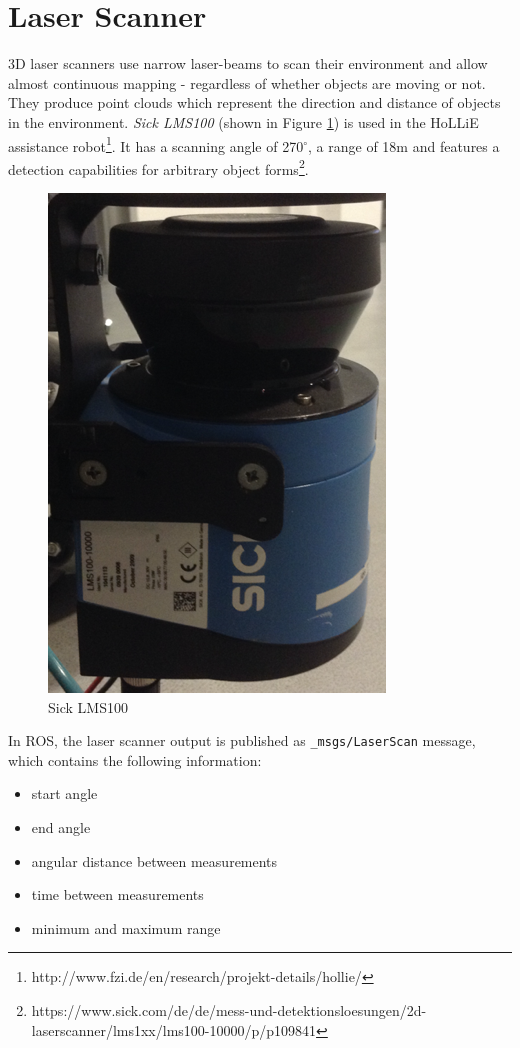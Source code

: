 \section{Laser Scanner}
3D laser scanners use narrow laser-beams to scan their environment and allow almost continuous mapping - regardless of whether objects are moving or not. They produce point clouds which represent the direction and distance of objects in the environment. \textit{Sick LMS100} (shown in Figure \ref{Laser}) is used in the HoLLiE assistance robot\footnote{http://www.fzi.de/en/research/projekt-details/hollie/}. It has a scanning angle of  270$^\circ$, a range of 18m and features a detection capabilities for arbitrary object forms\footnote{https://www.sick.com/de/de/mess-und-detektionsloesungen/2d-laserscanner/lms1xx/lms100-10000/p/p109841}.

\begin{figure}[thb]
      \centering
      \includegraphics[scale=0.8]{graphics/Laserscanner.png}
      \caption{Sick LMS100}
      \label{Laser}
\end{figure}

In ROS, the laser scanner output is published as \texttt{\_msgs/LaserScan} message, which contains the following information:
\begin{itemize}
\item start angle
\item end angle
\item angular distance between measurements
\item time between measurements
\item minimum and maximum range
\end{itemize}

